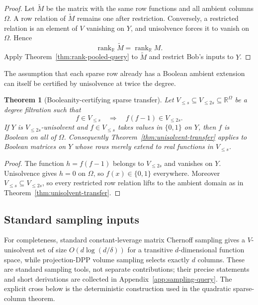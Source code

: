 \documentclass[11pt]{article}
\newtheorem{theorem}{Theorem}[section]
\theoremstyle{definition}
\theoremstyle{remark}
\newcommand{\R}{\mathbb R}
\newcommand{\1}{\mathbf 1}
\newcommand{\rank}{\operatorname{rank}}
\begin{document}
\begin{proof}
Let $\widetilde M$ be the matrix with the same row functions and all ambient
columns $\Omega$.  A row relation of $\widetilde M$ remains one after
restriction.  Conversely, a restricted relation is an element of $V$
vanishing on $Y$, and unisolvence forces it to vanish on $\Omega$.  Hence
\[
 \rank_{\R}\widetilde M=\rank_{\R}M.
\]
Apply Theorem~\ref{thm:rank-pooled-query} to $\widetilde M$ and restrict Bob's
inputs to $Y$.
\end{proof}

The assumption that each sparse row already has a Boolean ambient extension
can itself be certified by unisolvence at twice the degree.

\begin{theorem}[Booleanity-certifying sparse transfer]
\label{thm:booleanity-certifying-transfer}
Let $V_{\le s}\subseteq V_{\le2s}\subseteq\R^\Omega$ be a degree filtration
such that
\[
 f\in V_{\le s}\quad\Longrightarrow\quad f(f-1)\in V_{\le2s}.
\]
If $Y$ is $V_{\le2s}$-unisolvent and $f\in V_{\le s}$ takes values in
$\{0,1\}$ on $Y$, then $f$ is Boolean on all of $\Omega$.  Consequently
Theorem~\ref{thm:unisolvent-transfer} applies to Boolean matrices on $Y$
whose rows merely extend to real functions in $V_{\le s}$.
\end{theorem}

\begin{proof}
The function $h=f(f-1)$ belongs to $V_{\le2s}$ and vanishes on $Y$.
Unisolvence gives $h=0$ on $\Omega$, so $f(x)\in\{0,1\}$ everywhere.
Moreover $V_{\le s}\subseteq V_{\le2s}$, so every restricted row relation
lifts to the ambient domain as in Theorem~\ref{thm:unisolvent-transfer}.
\end{proof}


\subsection{Standard sampling inputs}

For completeness, standard constant-leverage matrix Chernoff sampling gives a
$V$-unisolvent set of size $O(d\log(d/\delta))$ for a transitive
$d$-dimensional function space, while projection-DPP volume sampling selects
exactly $d$ columns.  These are standard sampling tools, not separate
contributions; their precise statements and short derivations are collected
in Appendix~\ref{app:sampling-query}.  The explicit cross below is the
deterministic construction used in the quadratic sparse-column theorem.
\end{document}
